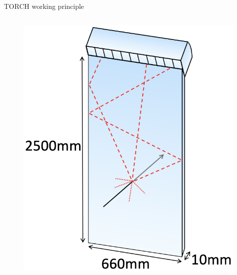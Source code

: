 \documentclass[xcolor={dvipsnames}]{beamer}
\begin{document}
\begin{frame}{TORCH working principle}
\begin{columns}
\begin{column}{0.45\textwidth}
\begin{figure}
        \includegraphics[width = 1.0\textwidth]{Figs/TORCH_FrontView.png}
      \end{figure}
    \end{column}
  \end{columns}
\end{frame}
\end{document}
